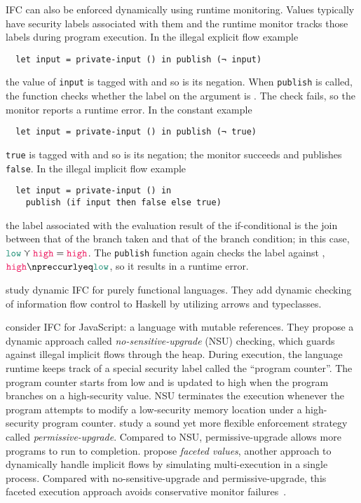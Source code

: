IFC can also be enforced dynamically using runtime monitoring. Values typically
have security labels associated with them and the runtime monitor tracks those
labels during program execution. In the illegal explicit flow example
\begin{verbatim}
  let input = private-input () in publish (¬ input)
\end{verbatim}
the value of \texttt{input} is tagged with \high and so is its negation. When
\texttt{publish} is called, the function checks whether the label on the
argument is \low. The check fails, so the monitor reports a runtime error. In
the constant example
\begin{verbatim}
  let input = private-input () in publish (¬ true)
\end{verbatim}
\texttt{true} is tagged with \low and so is its negation; the monitor succeeds
and publishes \texttt{false}. In the illegal implicit flow example
\begin{verbatim}
  let input = private-input () in
    publish (if input then false else true)
\end{verbatim}
the label associated with the evaluation result of the if-conditional is the
join between that of the branch taken and that of the branch condition; in this
case, $\low \curlyvee \high = \high$. The \texttt{publish} function again checks
the label against \low, $\high \npreccurlyeq \low$, so it results in a runtime
error.

\textcite{li2006encoding,LI20101974} study dynamic IFC for purely functional
languages. They add dynamic checking of information flow control to Haskell by
utilizing arrows and typeclasses.

\textcite{austin2009efficient} consider IFC for JavaScript: a language with
mutable references. They propose a dynamic approach called
\textit{no-sensitive-upgrade} (NSU) checking, which guards against illegal
implicit flows through the heap. During execution, the language runtime keeps
track of a special security label called the ``program counter''. The program
counter starts from low and is updated to high when the program branches on a
high-security value. NSU terminates the execution whenever the program attempts
to modify a low-security memory location under a high-security program counter.
\textcite{austin2010permissive} study a sound yet more flexible enforcement
strategy called \textit{permissive-upgrade}. Compared to NSU, permissive-upgrade
allows more programs to run to completion. \textcite{austin2012multiple} propose
\textit{faceted values}, another approach to dynamically handle implicit flows
by simulating multi-execution in a single process. Compared with
no-sensitive-upgrade and permissive-upgrade, this faceted execution approach
avoids conservative monitor failures~\parencite{Austin:2017uh}.

